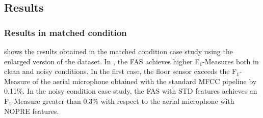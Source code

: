 \subsection{Results}
\subsubsection{Results in matched condition}
 shows the results obtained in the matched condition case study using the enlarged version of the dataset. In , the FAS achieves higher F$_1$-Measures both in clean and noisy conditions. In the first case, the floor sensor exceeds the F$_1$-Measure of the aerial microphone obtained with the standard MFCC pipeline by 0.11\%. In the noisy condition case study, the FAS with STD features achieves an F$_1$-Measure greater than 0.3\% with respect to the aerial microphone with NOPRE features.

